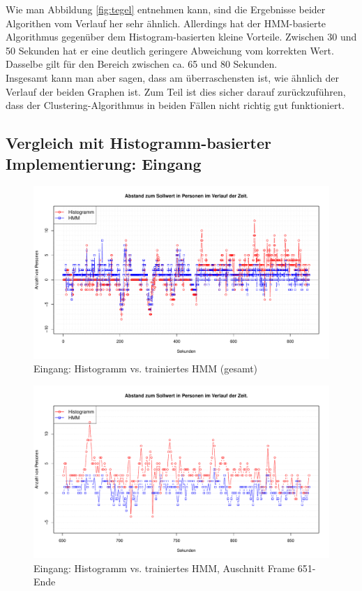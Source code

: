 Wie man Abbildung \ref{fig:tegel} entnehmen kann, sind die Ergebnisse beider Algorithen vom Verlauf her sehr ähnlich.
Allerdings hat der HMM-basierte Algorithmus gegenüber dem Histogram-basierten kleine Vorteile.
Zwischen 30 und 50 Sekunden hat er eine deutlich geringere Abweichung vom korrekten Wert.
Dasselbe gilt für den Bereich zwischen ca. 65 und 80 Sekunden.\\
Insgesamt kann man aber sagen, dass am überraschensten ist, wie ähnlich der Verlauf der beiden Graphen ist. Zum Teil ist dies sicher darauf zurückzuführen, dass der Clustering-Algorithmus in beiden Fällen nicht richtig gut funktioniert.

\subsection{Vergleich mit Histogramm-basierter Implementierung: Eingang}
\label{sec:eval_eingang}
\begin{figure}
	\centering
\includegraphics[width=1\textwidth]{bilder/eingang2_histo_vs_hmm_prelearned.pdf}
\caption{Eingang: Histogramm vs. trainiertes HMM (gesamt)}
	\label{fig:Eingang-gesamt}
\end{figure}
\begin{figure}
	\centering
	\includegraphics[width=1\textwidth]{bilder/safest_plot_histo_vs_prelearned_652-end.pdf}
	\caption{Eingang: Histogramm vs. trainiertes HMM, Auschnitt Frame 651-Ende}
	\label{fig:Eingang-teil}
\end{figure}
